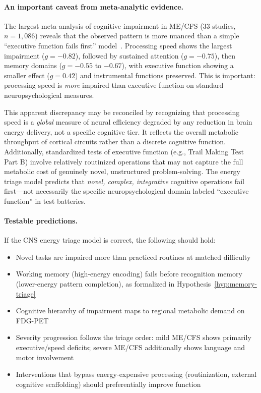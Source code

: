 \begin{speculation}
\paragraph{An important caveat from meta-analytic evidence.}
The largest meta-analysis of cognitive impairment in ME/CFS (33 studies, $n = 1{,}086$) reveals that the observed pattern is more nuanced than a simple ``executive function fails first'' model~\cite{Sebaiti2022cognitive}. Processing speed shows the largest impairment ($g = -0.82$), followed by sustained attention ($g = -0.75$), then memory domains ($g = -0.55$ to $-0.67$), with executive function showing a smaller effect ($g = 0.42$) and instrumental functions preserved. This is important: processing speed is \emph{more} impaired than executive function on standard neuropsychological measures.

This apparent discrepancy may be reconciled by recognizing that processing speed is a \emph{global} measure of neural efficiency degraded by any reduction in brain energy delivery, not a specific cognitive tier. It reflects the overall metabolic throughput of cortical circuits rather than a discrete cognitive function. Additionally, standardized tests of executive function (e.g., Trail Making Test Part B) involve relatively routinized operations that may not capture the full metabolic cost of genuinely novel, unstructured problem-solving. The energy triage model predicts that \emph{novel, complex, integrative} cognitive operations fail first---not necessarily the specific neuropsychological domain labeled ``executive function'' in test batteries.

\paragraph{Testable predictions.}
If the CNS energy triage model is correct, the following should hold:
\begin{itemize}
    \item Novel tasks are impaired more than practiced routines at matched difficulty
    \item Working memory (high-energy encoding) fails before recognition memory (lower-energy pattern completion), as formalized in Hypothesis~\ref{hyp:memory-triage}
    \item Cognitive hierarchy of impairment maps to regional metabolic demand on FDG-PET
    \item Severity progression follows the triage order: mild ME/CFS shows primarily executive/speed deficits; severe ME/CFS additionally shows language and motor involvement
    \item Interventions that bypass energy-expensive processing (routinization, external cognitive scaffolding) should preferentially improve function
\end{itemize}


\end{speculation}
